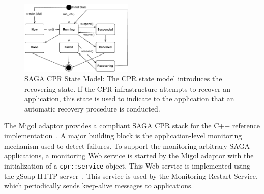 \documentclass[times, 10pt,twocolumn]{article}
\begin{document}
\begin{figure}[th]
    \centering
        \includegraphics[width=0.48\textwidth]{cpr-statemodel.pdf}
    \caption{SAGA CPR State Model: The CPR state model introduces the recovering state. If the CPR infrastructure attempts to recover an application, this state is used to indicate to the application that an automatic recovery procedure is conducted.}
    \label{fig:cpr-statemodel}
\end{figure}
 

The Migol adaptor provides a compliant SAGA CPR stack for the C++ reference implementation~\cite{Kaiser:2006qp}. 
A major building block is the application-level monitoring mechanism used to detect failures. 
To support the monitoring arbitrary SAGA applications, a monitoring Web service is started 
by the Migol adaptor with the initialization of a \texttt{cpr::service} object. This Web 
service is implemented using the gSoap HTTP server~\cite{gsoap}.  This service is used by the Monitoring Restart Service,
which periodically sends keep-alive messages to applications.                                                                             

\end{document}
